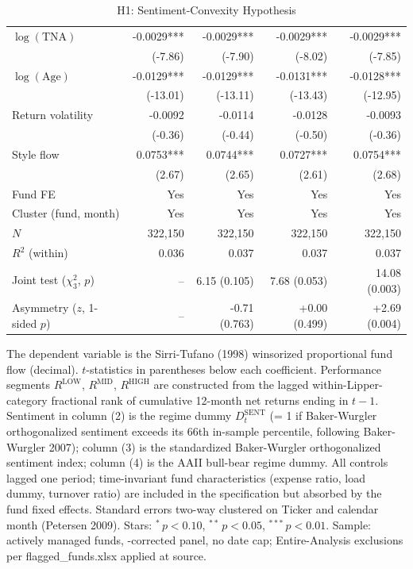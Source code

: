 \begin{table}[!htbp]
{\begin{tabular*}{\linewidth}{@{\extracolsep{\fill}}lrrrr}
$\log(\text{TNA})$ & -0.0029*** & -0.0029*** & -0.0029*** & -0.0029***\\
 & (-7.86) & (-7.90) & (-8.02) & (-7.85)\\
$\log(\text{Age})$ & -0.0129*** & -0.0129*** & -0.0131*** & -0.0128***\\
 & (-13.01) & (-13.11) & (-13.43) & (-12.95)\\
Return volatility & -0.0092 & -0.0114 & -0.0128 & -0.0093\\
 & (-0.36) & (-0.44) & (-0.50) & (-0.36)\\
Style flow & 0.0753*** & 0.0744*** & 0.0727*** & 0.0754***\\
 & (2.67) & (2.65) & (2.61) & (2.68)\\
\midrule
Fund FE & Yes & Yes & Yes & Yes\\
Cluster (fund, month) & Yes & Yes & Yes & Yes\\
$N$ & 322,150 & 322,150 & 322,150 & 322,150\\
$R^2$ (within) & 0.036 & 0.037 & 0.037 & 0.037\\
Joint test ($\chi^2_3$, $p$) & -- & 6.15 (0.105) & 7.68 (0.053) & 14.08 (0.003)\\
Asymmetry ($z$, 1-sided $p$) & -- & -0.71 (0.763) & +0.00 (0.499) & +2.69 (0.004)\\
\bottomrule
\end{tabular*}%
}\sbefit
\fi
\setlength{\tabletempwidth}{\wd\tabletempbox}
\ifdim\tabletempwidth>\linewidth\setlength{\tabletempwidth}{\linewidth}\fi
\begin{minipage}{\tabletempwidth}
\captionsetup{width=\linewidth}
\caption{H1: Sentiment-Convexity Hypothesis}\label{tab:H1_regression}
\ifdim\wd\tabletempbox>\linewidth
  \resizebox{\linewidth}{!}{\usebox{\tabletempbox}}
\else
  \usebox{\tabletempbox}
\fi
\par\medskip
\begin{singlespace}\tablefont\noindent
The dependent variable is the Sirri-Tufano (1998) winsorized proportional fund flow (decimal). $t$-statistics in parentheses below each coefficient. Performance segments $R^{\text{LOW}}$, $R^{\text{MID}}$, $R^{\text{HIGH}}$ are constructed from the lagged within-Lipper-category fractional rank of cumulative 12-month net returns ending in $t-1$. Sentiment in column (2) is the regime dummy $D^{\text{SENT}}_t$ (= 1 if Baker-Wurgler orthogonalized sentiment exceeds its 66th in-sample percentile, following Baker-Wurgler 2007); column (3) is the standardized Baker-Wurgler orthogonalized sentiment index; column (4) is the AAII bull-bear regime dummy. All controls lagged one period; time-invariant fund characteristics (expense ratio, load dummy, turnover ratio) are included in the specification but absorbed by the fund fixed effects. Standard errors two-way clustered on Ticker and calendar month (Petersen 2009). Stars: $^{*}\,p<0.10$, $^{**}\,p<0.05$, $^{***}\,p<0.01$. Sample: actively managed funds, \textcite{Evans2010}-corrected panel, no date cap; Entire-Analysis exclusions per flagged\_funds.xlsx applied at source.
\end{singlespace}
\end{minipage}
\end{table}


